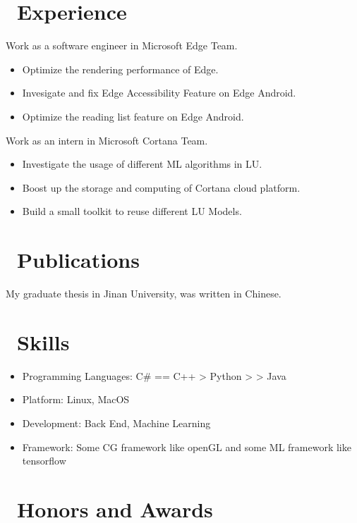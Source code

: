 \documentclass{resume}
\begin{document}
\section{\faUsers\ Experience}

Work as a software engineer in Microsoft Edge Team.
\begin{itemize}
		\item Optimize the rendering performance of Edge.
		\item Invesigate and fix Edge Accessibility Feature on Edge Android.
		\item Optimize the reading list feature on Edge Android.
\end{itemize}

Work as an intern in Microsoft Cortana Team.
\begin{itemize}
		\item Investigate the usage of different ML algorithms in LU.
		\item Boost up the storage and computing of Cortana cloud platform.
		\item Build a small toolkit to reuse different LU Models.
\end{itemize}

\section{\faCogs\ Publications}
My graduate thesis in Jinan University, was written in Chinese.

\section{\faCogs\ Skills}
\begin{itemize}[parsep=0.5ex]
  \item Programming Languages: C\# == C++ > Python > > Java
  \item Platform: Linux, MacOS
  \item Development: Back End, Machine Learning
	\item Framework: Some CG framework like openGL and some ML framework like tensorflow
\end{itemize}

\section{\faHeartO\ Honors and Awards}
\end{document}
